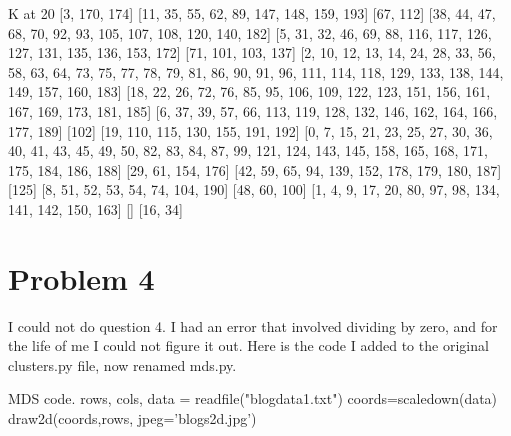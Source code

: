 \documentclass[11pt]{report}
\begin{document}
\begin{mylisting}{K at 20}
[3, 170, 174]
[11, 35, 55, 62, 89, 147, 148, 159, 193]
[67, 112]
[38, 44, 47, 68, 70, 92, 93, 105, 107, 108, 120, 140, 182]
[5, 31, 32, 46, 69, 88, 116, 117, 126, 127, 131, 135, 136, 153, 172]
[71, 101, 103, 137]
[2, 10, 12, 13, 14, 24, 28, 33, 56, 58, 63, 64, 73, 75, 77, 78, 79, 81, 86, 90, 91, 96, 111, 114, 118, 129, 133, 138, 144, 149, 157, 160, 183]
[18, 22, 26, 72, 76, 85, 95, 106, 109, 122, 123, 151, 156, 161, 167, 169, 173, 181, 185]
[6, 37, 39, 57, 66, 113, 119, 128, 132, 146, 162, 164, 166, 177, 189]
[102]
[19, 110, 115, 130, 155, 191, 192]
[0, 7, 15, 21, 23, 25, 27, 30, 36, 40, 41, 43, 45, 49, 50, 82, 83, 84, 87, 99, 121, 124, 143, 145, 158, 165, 168, 171, 175, 184, 186, 188]
[29, 61, 154, 176]
[42, 59, 65, 94, 139, 152, 178, 179, 180, 187]
[125]
[8, 51, 52, 53, 54, 74, 104, 190]
[48, 60, 100]
[1, 4, 9, 17, 20, 80, 97, 98, 134, 141, 142, 150, 163]
[]
[16, 34]
\end{mylisting}
\pagebreak
\section{Problem 4}
I could not do question 4. I had an error that involved dividing by zero, and for the life of me I could not figure it out. Here is the code I added to the original clusters.py file, now renamed mds.py.

\begin{mylisting}{MDS code.}
 rows, cols, data = readfile("blogdata1.txt")
 coords=scaledown(data)
 draw2d(coords,rows, jpeg='blogs2d.jpg')

\end{mylisting}
\end{document}
